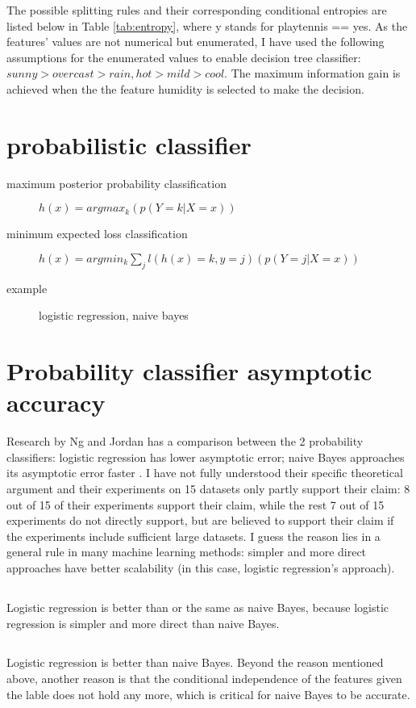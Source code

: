 \documentclass[12pt]{article}
\begin{document}
\begin{multicols}{2}
  The possible splitting rules and their corresponding conditional entropies are listed below in Table \ref{tab:entropy}, where y stands for playtennis == yes. As the features' values are not numerical but enumerated, I have used the following assumptions for the enumerated values to enable decision tree classifier: $sunny > overcast > rain, hot > mild > cool$. The maximum information gain is achieved when the the feature humidity is selected to make the decision.

  \section{probabilistic classifier}
  \begin{description}
    \item[maximum posterior probability classification] $h(x) = argmax_k(p(Y=k|X=x))$
    \item[minimum expected loss classification] $h(x) = argmin_k \sum_j l(h(x)=k,y=j)(p(Y=j|X=x))$
      \item[example] logistic regression, naive bayes
  \end{description}

  \section{Probability classifier asymptotic accuracy}
  Research by Ng and Jordan has a comparison between the 2 probability classifiers: logistic regression has lower asymptotic error; naive Bayes approaches its asymptotic error faster \cite{jordan2002discriminative}. I have not fully understood their specific theoretical argument and their experiments on 15 datasets only partly support their claim: 8 out of 15 of their experiments support their claim, while the rest 7 out of 15 experiments do not directly support, but are believed to support their claim if the experiments include sufficient large datasets. I guess the reason lies in a general rule in many machine learning methods: simpler and more direct approaches have better scalability (in this case, logistic regression's approach).
  \subsection{}
  Logistic regression is better than or the same as naive Bayes, because logistic regression is simpler and more direct than naive Bayes.
  \subsection{}
  Logistic regression is better than naive Bayes. Beyond the reason mentioned above, another reason is that the conditional independence of the features given the lable does not hold any more, which is critical for naive Bayes to be accurate.


\end{multicols}
\end{document}
